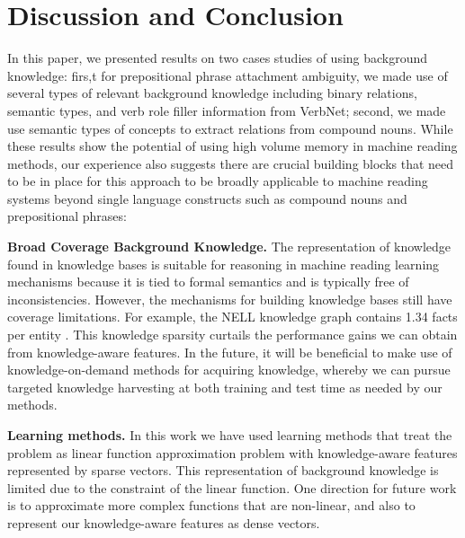 \documentclass[jair,twoside,11pt,theapa]{article}
\renewcommand{\paragraph}[1]{\noindent\textbf{#1.}}
\begin{document}
\section{Discussion and Conclusion}\label{conclusions}
In this paper, we presented results on two cases studies of using background knowledge: firs,t for prepositional phrase attachment ambiguity,  we made  use of several types of relevant background knowledge including binary relations, semantic types, and verb role filler information from VerbNet;  second, we made use semantic types of concepts to extract relations from compound  nouns. While these results show the potential of using high volume memory in machine reading methods,  our experience also suggests there are crucial building blocks
that need to be in place for this approach to be broadly applicable  to machine reading systems beyond 
single language constructs such as compound nouns and prepositional phrases: 

\paragraph{Broad Coverage Background Knowledge} The representation of knowledge  found in knowledge bases is suitable for reasoning in machine reading learning mechanisms because it is tied to formal semantics and is typically free of inconsistencies.   However, the mechanisms for building knowledge bases still have coverage limitations. For example, the NELL knowledge graph contains 1.34 facts per entity \cite{conf/emnlp/HegdeT15}.  This knowledge sparsity curtails the performance gains we can obtain from  knowledge-aware features. In the future, it will be beneficial to make use of knowledge-on-demand methods for acquiring knowledge, whereby we can pursue targeted knowledge harvesting at both training and test time as needed by our methods.


\paragraph{Learning methods} In this work we have used learning methods that treat the problem as  linear function approximation problem with knowledge-aware features represented by sparse vectors. This representation of background  knowledge is limited due to the constraint of the linear function. One  direction  for future work is to approximate more complex functions that are non-linear, and also to represent our knowledge-aware features as dense vectors.
\end{document}

